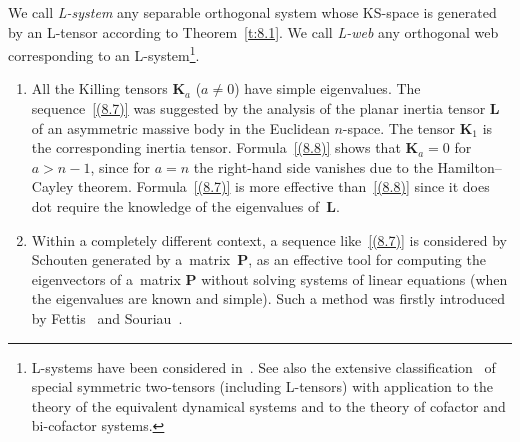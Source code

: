 \documentclass[10pt,a4paper]{amsart}
\def\bs{\boldsymbol}
\numberwithin{equation}{section}
\begin{document}
We call {\it L-system} any separable orthogonal system whose KS-space is generated by an L-tensor according to Theorem~\ref{t:8.1}. We call {\it L{\rm -}web} any orthogonal web corresponding to an L-system\footnote{L-systems have been considered in~\cite{Blaszak-Marciniak-2006, Blaszak-Sergyeyev-2005}. See also the  extensive classif\/ication~\cite{Benenti-2005} of special symmetric two-tensors (including L-tensors) with application to the theory of the equivalent dynamical systems and to the theory of cofactor and bi-cofactor systems.\label{pagenote2}}.

\begin{Remarks}\quad
\begin{enumerate}\itemsep=0pt
\item[(i)] All the Killing tensors $\bs K_a$ ($a\neq 0$) have simple eigenvalues. The sequence~\eqref{(8.7)} was suggested by the analysis \cite{Benenti-1992b} of the planar inertia tensor $\bs L$ of an asymmetric massive body in the Euclidean $n$-space. The tensor $\bs K_1$ is the corresponding inertia tensor.
Formula~\eqref{(8.8)} shows that $\bs K_a=0$ for $a>n-1$, since for $a=n$ the right-hand side vanishes due to the Hamilton--Cayley theorem. Formula~\eqref{(8.7)} is more ef\/fective than~\eqref{(8.8)} since it does dot require the knowledge of the eigenvalues of~$\bs L$.

\item[(ii)] Within  a completely dif\/ferent context, a sequence like~\eqref{(8.7)} is considered by Schouten  \cite[p.~30]{Schouten-1954} generated by a~matrix~$\bs P$, as an ef\/fective tool for computing the eigenvectors of a~matrix $\bs P$ without solving systems of linear equations (when the eigenvalues are known and simple). Such a method was f\/irstly introduced by Fettis~\cite{Fettis-1950} and Souriau~\cite{Souriau-1950}.


\end{enumerate}
\end{Remarks}
\end{document}
